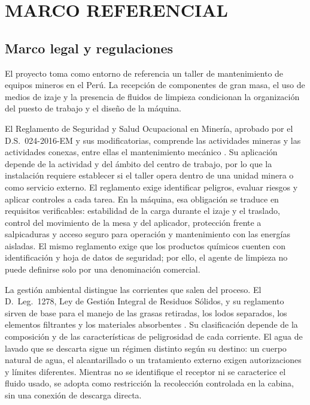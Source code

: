 \chapter{MARCO REFERENCIAL}
\label{cap:marco-referencial}

\section{Marco legal y regulaciones}

El proyecto toma como entorno de referencia un taller de mantenimiento de equipos mineros en el Perú. La recepción de componentes de gran masa, el uso de medios de izaje y la presencia de fluidos de limpieza condicionan la organización del puesto de trabajo y el diseño de la máquina.

El Reglamento de Seguridad y Salud Ocupacional en Minería, aprobado por el D.S.~024-2016-EM y sus modificatorias, comprende las actividades mineras y las actividades conexas, entre ellas el mantenimiento mecánico \cite{ds024}. Su aplicación depende de la actividad y del ámbito del centro de trabajo, por lo que la instalación requiere establecer si el taller opera dentro de una unidad minera o como servicio externo. El reglamento exige identificar peligros, evaluar riesgos y aplicar controles a cada tarea. En la máquina, esa obligación se traduce en requisitos verificables: estabilidad de la carga durante el izaje y el traslado, control del movimiento de la mesa y del aplicador, protección frente a salpicaduras y acceso seguro para operación y mantenimiento con las energías aisladas. El mismo reglamento exige que los productos químicos cuenten con identificación y hoja de datos de seguridad; por ello, el agente de limpieza no puede definirse solo por una denominación comercial.

La gestión ambiental distingue las corrientes que salen del proceso. El D.\ Leg.~1278, Ley de Gestión Integral de Residuos Sólidos, y su reglamento sirven de base para el manejo de las grasas retiradas, los lodos separados, los elementos filtrantes y los materiales absorbentes \cite{dleg1278}. Su clasificación depende de la composición y de las características de peligrosidad de cada corriente. El agua de lavado que se descarta sigue un régimen distinto según su destino: un cuerpo natural de agua, el alcantarillado o un tratamiento externo exigen autorizaciones y límites diferentes. Mientras no se identifique el receptor ni se caracterice el fluido usado, se adopta como restricción la recolección controlada en la cabina, sin una conexión de descarga directa.


